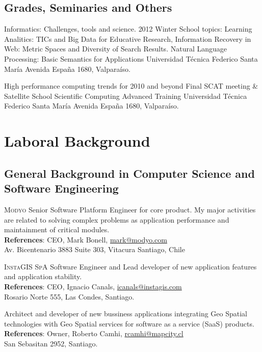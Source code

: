 \documentclass[11pt,letterpaper,roman]{moderncv}
\begin{document}
\subsection{Grades, Seminaries and Others}

	{Informatics: Challenges, tools and science.}
	{2012 Winter School}
	{topics: Learning Analitics: TICs and Big Data for Educative Research, Information Recovery in Web: Metric Spaces and Diversity of Search Results. Natural Language Processing: Basic Semantics for Applications }
	{Universidad T\'ecnica Federico Santa Mar\'ia}
	{Avenida España 1680, Valpara\'iso.}
	
	
	{High performance computing trends for 2010 and beyond}
	{Final SCAT meeting \& Satellite School}
	{Scientific Computing Advanced Training}
	{Universidad T\'ecnica Federico Santa Mar\'ia}
	{Avenida España 1680, Valpara\'iso.}


\section{Laboral Background}

\subsection{General Background in Computer Science and Software Engineering}


	 {\se} {\textsc{Modyo}} {\stgo} {}
	{Senior Software Platform Engineer for core product. My major activities
    are related to solving complex problems as application performance and maintainment of critical modules.
	\\ \textbf{References}: CEO, Mark Bonell, \url{mark@modyo.com}
	\\ Av. Bicentenario 3883 Suite 303, Vitacura Santiago, Chile
	} 

	 {\se} {\textsc{InstaGIS SpA}} {\stgo} {}
	{Software Engineer and Lead developer of new application features and application stability.
    \\ \textbf{References}: CEO, Ignacio Canals, \url{icanals@instagis.com}
	\\ Rosario Norte 555, Las Condes, Santiago.
	} 

	 {\se} {\mapcity} {\stgo} {}
	{Architect and developer of new bussiness applications integrating Geo Spatial technologies with Geo Spatial services for software as a service (SaaS) products.
	\\ \textbf{References}: Owner, Roberto Camhi, \url{rcamhi@mapcity.cl}
	\\ San Sebasitan 2952, Santiago.
	} 
\end{document}
